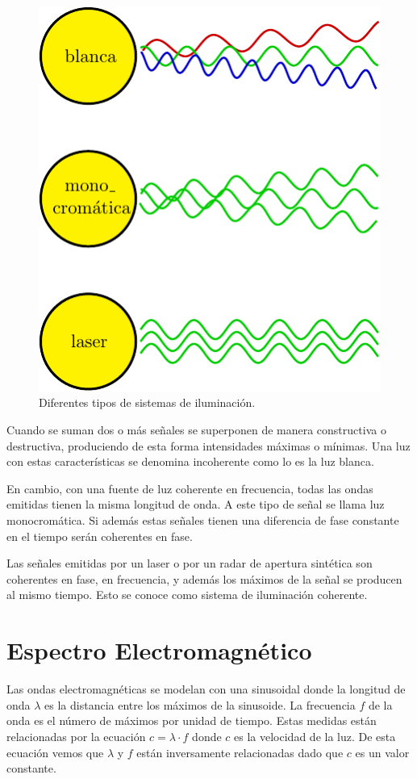 \begin{figure}[hbt]
	\centering    
	\includegraphics[scale=0.7]{../../Figures/Tesis/Capitulo3/LuzCoherenteTico.pdf}
	\caption{\label{LuzCoherente}Diferentes tipos de sistemas de iluminación.}
\end{figure} 

Cuando se suman dos o más señales se superponen de manera constructiva o destructiva, produciendo de esta forma intensidades máximas o mínimas. Una luz con estas características se denomina incoherente como lo es la luz blanca.

En cambio, con una fuente de luz coherente en frecuencia, todas las ondas emitidas tienen la misma longitud de onda. A este tipo de señal se llama luz monocromática. Si además estas señales tienen una diferencia de fase constante en el tiempo serán coherentes en fase. 

Las señales emitidas por un laser o por un radar de apertura sintética son coherentes en fase, en frecuencia, y además los máximos de la señal se producen al mismo tiempo. Esto se conoce como sistema de iluminación coherente.

\section{Espectro Electromagnético}

Las ondas electromagnéticas se modelan con una sinusoidal donde la longitud de onda $\lambda$ es la distancia entre los máximos de la sinusoide. La frecuencia $f$ de la onda es el número de máximos por unidad de tiempo. Estas medidas están relacionadas por la ecuación $c=\lambda \cdot f$ donde $c$ es la velocidad de la luz. De esta ecuación vemos que $\lambda$ y $f$ están inversamente relacionadas dado que $c$ es un valor constante.

